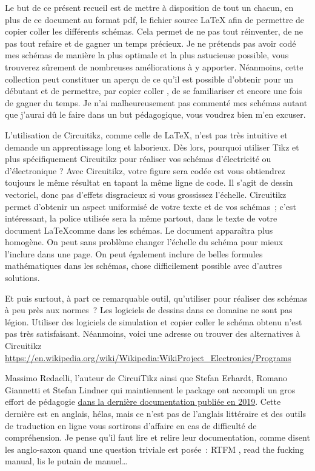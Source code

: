 \documentclass[10pt]{article}
\begin{document}
Le but de ce présent recueil est de mettre à disposition de tout un chacun, en plus de ce document au format pdf, le fichier source \LaTeX{} afin de permettre de \og copier coller \fg{} les différents schémas. Cela permet de ne pas tout réinventer, de ne pas tout refaire et de gagner un temps précieux. Je ne prétends pas avoir \og codé \fg{} mes schémas de manière la plus optimale et la plus astucieuse possible, vous trouverez sûrement de nombreuses améliorations à y apporter. Néanmoins, cette collection peut constituer un aperçu de ce qu'il est possible d'obtenir pour un débutant et de permettre, par \og copier coller \fg, de se familiariser et encore une fois de gagner du temps. Je n'ai malheureusement pas commenté mes schémas autant que j'aurai dû le faire dans un but pédagogique, vous voudrez bien m'en excuser.

\vspace{0.5cm}

L'utilisation de Circuitikz, comme celle de \LaTeX, n'est pas très intuitive et demande un apprentissage long et laborieux. Dès lors, pourquoi utiliser Tikz et plus spécifiquement Circuitikz pour réaliser vos schémas d'électricité ou d'électronique ? Avec Circuitikz, votre figure sera codée est vous obtiendrez toujours le même résultat en tapant la même ligne de code. Il s'agit de dessin vectoriel, donc pas d'effets disgracieux si vous grossissez l'échelle. Circuitikz permet d'obtenir un aspect uniformisé de votre texte et de vos schémas~; c'est intéressant, la police utilisée sera la même partout, dans le texte de votre document \LaTeX comme dans les schémas. Le document apparaîtra plus homogène. On peut sans problème changer l'échelle du schéma pour mieux l'inclure dans une page. On peut également inclure de belles formules mathématiques dans les schémas, chose difficilement possible avec d'autres solutions.

Et puis surtout, à part ce remarquable outil, qu'utiliser pour réaliser des schémas à peu près aux normes~? Les logiciels de dessins dans ce domaine ne sont pas légion. Utiliser des logiciels de simulation et \og copier coller \fg{} le schéma obtenu n'est pas très satisfaisant. Néanmoins, voici une adresse ou trouver des alternatives à Circuitikz \url{https://en.wikipedia.org/wiki/Wikipedia:WikiProject_Electronics/Programs}

\vspace{0.5cm}

Massimo Redaelli, l'auteur de CircuiTikz ainsi que 	Stefan Erhardt, Romano Giannetti et Stefan Lindner qui maintiennent le package ont accompli un gros effort de pédagogie  \href{https://www.google.fr/url?sa=t&rct=j&q=&esrc=s&source=web&cd=&ved=2ahUKEwibk-CEyITtAhVFyxoKHbMFDBMQFjAAegQIBhAC&url=http%3A%2F%2Ftexdoc.net%2Ftexmf-dist%2Fdoc%2Flatex%2Fcircuitikz%2Fcircuitikzmanual.pdf&usg=AOvVaw3wW8oOXJGx8ByXEr6LWQqV}{dans la dernière documentation publiée en 2019}. Cette dernière est en anglais, hélas, mais ce n'est pas de l'anglais littéraire et des outils de traduction en ligne vous sortirons d'affaire en cas de difficulté de compréhension. Je pense qu'il faut lire et relire leur documentation, comme disent les anglo-saxon quand une question triviale est posée~: \og RTFM \fg, read the fucking manual, lis le putain de manuel\dots
\end{document}
